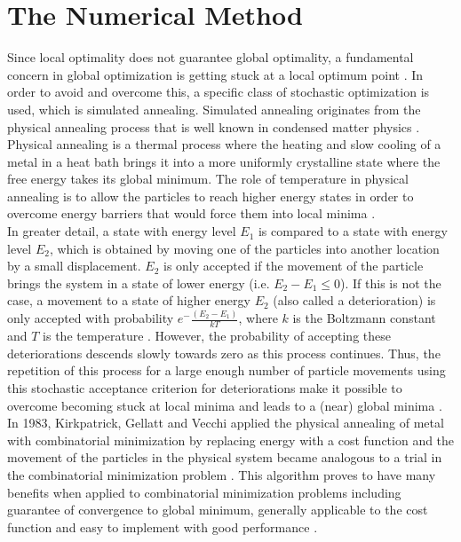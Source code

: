 \section{The Numerical Method}
\label{sec:related}


Since local optimality does not guarantee global optimality, a fundamental concern in global optimization is getting stuck at a local optimum point \cite{dekkers}. In order to avoid and overcome this, a specific class of stochastic optimization is used, which is simulated annealing. Simulated annealing originates from the physical annealing process that is well known in condensed matter physics \cite{dekkers}. Physical annealing is a thermal process where the heating and slow cooling of a metal in a heat bath brings it into a more uniformly crystalline state where the free energy takes its global minimum. The role of temperature in physical annealing is to allow the particles to reach higher energy states in order to overcome energy barriers that would force them into local minima \cite{neumaier}. \\
\hspace*{3mm}In greater detail, a state with energy level $E_1$ is compared to a state with energy level $E_2$, which is obtained by moving one of the particles into another location by a small displacement. $E_2$ is only accepted if the movement of the particle brings the system in a state of lower energy (i.e. $E_2-E_1\leq0$). If this is not the case, a movement to a state of higher energy $E_2$ (also called a deterioration) is only accepted with probability 
$e^-{\frac{(E_2-E_1)}{kT}}$, where $k$ is the Boltzmann constant and $T$ is the temperature \cite{dekkers}. However, the probability of accepting these deteriorations descends slowly towards zero as this process continues. Thus, the repetition of this process for a large enough number of particle movements using this stochastic acceptance criterion for deteriorations make it possible to overcome becoming stuck at local minima and leads to a (near) global minima \cite{dekkers}.\\
\hspace*{3mm}In 1983, Kirkpatrick, Gellatt and Vecchi applied the physical annealing of metal with combinatorial minimization by replacing energy with a cost function and the movement of the particles in the physical system became analogous to a trial in the combinatorial minimization problem \cite{dekkers}. This algorithm proves to have many benefits when applied to combinatorial minimization problems including guarantee of convergence to global minimum, generally applicable to the cost function and easy to implement with good performance \cite{dekkers}. \\
